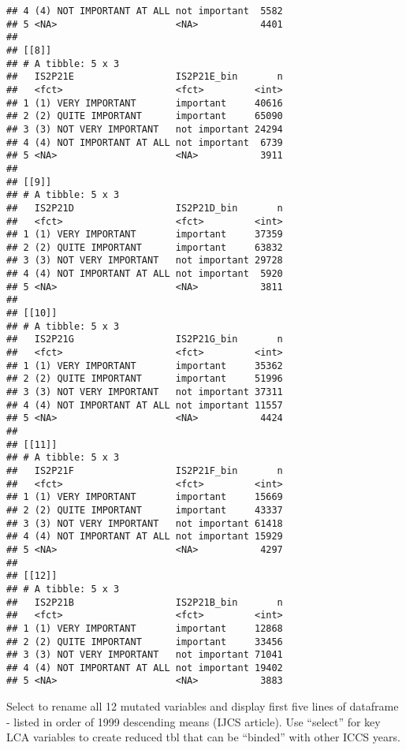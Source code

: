 \documentclass[]{article}
\begin{document}
\begin{verbatim}
## 4 (4) NOT IMPORTANT AT ALL not important  5582
## 5 <NA>                     <NA>           4401
## 
## [[8]]
## # A tibble: 5 x 3
##   IS2P21E                  IS2P21E_bin       n
##   <fct>                    <fct>         <int>
## 1 (1) VERY IMPORTANT       important     40616
## 2 (2) QUITE IMPORTANT      important     65090
## 3 (3) NOT VERY IMPORTANT   not important 24294
## 4 (4) NOT IMPORTANT AT ALL not important  6739
## 5 <NA>                     <NA>           3911
## 
## [[9]]
## # A tibble: 5 x 3
##   IS2P21D                  IS2P21D_bin       n
##   <fct>                    <fct>         <int>
## 1 (1) VERY IMPORTANT       important     37359
## 2 (2) QUITE IMPORTANT      important     63832
## 3 (3) NOT VERY IMPORTANT   not important 29728
## 4 (4) NOT IMPORTANT AT ALL not important  5920
## 5 <NA>                     <NA>           3811
## 
## [[10]]
## # A tibble: 5 x 3
##   IS2P21G                  IS2P21G_bin       n
##   <fct>                    <fct>         <int>
## 1 (1) VERY IMPORTANT       important     35362
## 2 (2) QUITE IMPORTANT      important     51996
## 3 (3) NOT VERY IMPORTANT   not important 37311
## 4 (4) NOT IMPORTANT AT ALL not important 11557
## 5 <NA>                     <NA>           4424
## 
## [[11]]
## # A tibble: 5 x 3
##   IS2P21F                  IS2P21F_bin       n
##   <fct>                    <fct>         <int>
## 1 (1) VERY IMPORTANT       important     15669
## 2 (2) QUITE IMPORTANT      important     43337
## 3 (3) NOT VERY IMPORTANT   not important 61418
## 4 (4) NOT IMPORTANT AT ALL not important 15929
## 5 <NA>                     <NA>           4297
## 
## [[12]]
## # A tibble: 5 x 3
##   IS2P21B                  IS2P21B_bin       n
##   <fct>                    <fct>         <int>
## 1 (1) VERY IMPORTANT       important     12868
## 2 (2) QUITE IMPORTANT      important     33456
## 3 (3) NOT VERY IMPORTANT   not important 71041
## 4 (4) NOT IMPORTANT AT ALL not important 19402
## 5 <NA>                     <NA>           3883
\end{verbatim}

Select to rename all 12 mutated variables and display first five lines
of dataframe - listed in order of 1999 descending means (IJCS article).
Use ``select'' for key LCA variables to create reduced tbl that can be
``binded'' with other ICCS years.
\end{document}
